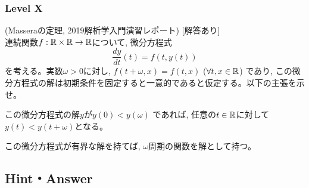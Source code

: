 \subsubsection{Level X}
\begin{prob} (Masseraの定理, 2019解析学入門演習レポート) [解答あり]\\
連続関数$f:\mathbb{R}\times\mathbb{R}\to \mathbb{R}$について, 微分方程式
\[\dfrac{dy}{dt}(t) = f(t,y(t))\]
を考える。実数$\omega > 0$に対し, $f(t+\omega,x) = f(t,x)$ ($\forall t,x\in \mathbb{R}$) であり, この微分方程式の解は初期条件を固定すると一意的であると仮定する。以下の主張を示せ。
\ben
\item この微分方程式の解$y$が$y(0) < y(\omega)$ であれば, 任意の$t\in \mathbb{R}$に対して$y(t) < y(t+\omega)$となる。
\item この微分方程式が有界な解を持てば, $\omega$周期の関数を解として持つ。
\een
\end{prob}

\subsection{Hint・Answer}


